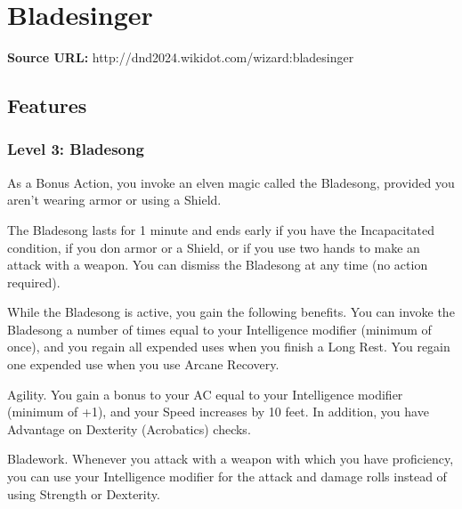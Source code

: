 \documentclass{article}
\begin{document}

\section*{ Bladesinger }

\textbf{Source URL:} http://dnd2024.wikidot.com/wizard:bladesinger

\vspace{1em}







\subsection*{Features}

\subsubsection*{ Level 3: Bladesong }

As a Bonus Action, you invoke an elven magic called the Bladesong, provided you aren’t wearing armor or using a Shield.

The Bladesong lasts for 1 minute and ends early if you have the Incapacitated condition, if you don armor or a Shield, or if you use two hands to make an attack with a weapon. You can dismiss the Bladesong at any time (no action required).

While the Bladesong is active, you gain the following benefits. You can invoke the Bladesong a number of times equal to your Intelligence modifier (minimum of once), and you regain all expended uses when you finish a Long Rest. You regain one expended use when you use Arcane Recovery.

Agility. You gain a bonus to your AC equal to your Intelligence modifier (minimum of +1), and your Speed increases by 10 feet. In addition, you have Advantage on Dexterity (Acrobatics) checks.

Bladework. Whenever you attack with a weapon with which you have proficiency, you can use your Intelligence modifier for the attack and damage rolls instead of using Strength or Dexterity.
\end{document}
